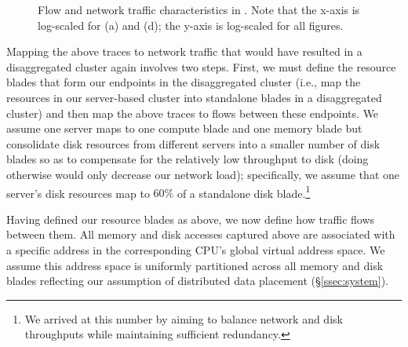 \begin{figure}
{	\label{fig:fsdp}
  }
  \renewcommand{\thesubfigure}{(d)}
  \renewcommand{\thesubfigure}{(f)}
  \caption{\small{Flow and network traffic characteristics in \dis. Note that the x-axis is log-scaled for (a) and (d); the y-axis is log-scaled for all figures.  }}
  \label{fig:traffic}
\end{figure}
%

Mapping the above traces to network traffic that would have resulted 
in a disaggregated cluster again involves two steps. First, we must 
define the resource blades that form our endpoints in the disaggregated cluster (i.e., map the resources in our server-based cluster into standalone blades in a disaggregated cluster) and then map the above traces to flows between these endpoints. 
We assume one server maps to one compute blade and one memory blade but consolidate disk resources from different servers into a smaller number of disk blades so as to compensate for the relatively low throughput to disk (doing otherwise would only decrease our network load); specifically, we 
assume that one server's disk resources map to $60\%$ of a standalone 
disk blade.\footnote{We arrived at this number by aiming to balance network and disk throughputs while maintaining sufficient redundancy.} 

Having defined our resource blades as above, we now define how traffic 
flows between them. 
All memory and disk accesses captured above are associated with a specific address in the corresponding CPU's global virtual address space. We assume this address space is uniformly partitioned across all memory and disk blades reflecting our assumption of distributed data placement (\S\ref{ssec:system}).  

